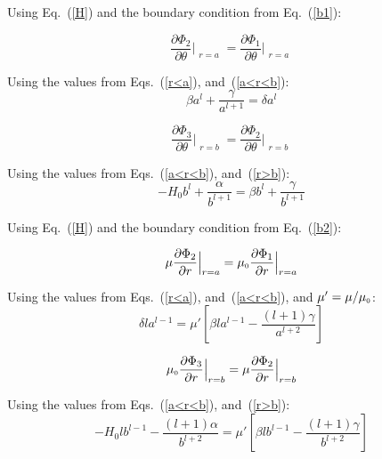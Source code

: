 Using Eq.~(\ref{H}) and the boundary condition from Eq.~(\ref{b1}): 


$$\frac{\partial \Phi_2}{\partial \theta}\Bigr|_{\substack{r=a}}=\frac{\partial \Phi_1}{\partial \theta}\Bigr|_{\substack{r=a}}$$

Using the values from Eqs.~(\ref{r<a}), and~(\ref{a<r<b}):
\begin{equation}\label{e01}
\beta a^l+\frac{\gamma}{a^{l+1}}=\delta a^l
\end{equation}

$$\frac{\partial \Phi_3}{\partial \theta}\Bigr|_{\substack{r=b}}=\frac{\partial \Phi_2}{\partial \theta}\Bigr|_{\substack{r=b}}$$

Using the values from Eqs.~(\ref{a<r<b}), and~(\ref{r>b}):
\begin{equation}\label{e02}
-H_0b^l+\frac{\alpha}{b^{l+1}}=\beta b^l+\frac{\gamma}{b^{l+1}}
\end{equation}



Using Eq.~(\ref{H}) and the boundary condition from Eq.~(\ref{b2}):

$$\mu \frac{\partial \Phi_2}{\partial r}\Bigr|_{\substack{r=a}}=\mu_{\scriptscriptstyle 0}\frac{\partial \Phi_1}{\partial r}\Bigr|_{\substack{r=a}}$$

Using the values from Eqs.~(\ref{r<a}), and~(\ref{a<r<b}), and  $\mu'=\mu/\mu_{\scriptscriptstyle 0}$:
\begin{equation}\label{e03}
\delta l a^{l-1}=\mu'\left[\beta l a^{l-1}-\frac{(l+1)\gamma}{a^{l+2}}\right]
\end{equation}


$$\mu_{\scriptscriptstyle 0}\frac{\partial \Phi_3}{\partial r}\Bigr|_{\substack{r=b}}=\mu\frac{\partial \Phi_2}{\partial r}\Bigr|_{\substack{r=b}}$$

Using the values from Eqs.~(\ref{a<r<b}), and~(\ref{r>b}):
\begin{equation}\label{e04}
-H_0lb^{l-1}-\frac{(l+1)\alpha}{b^{l+2}}=\mu'\left[\beta l b^{l-1}-\frac{(l+1)\gamma}{b^{l+2}}\right]
\end{equation}

